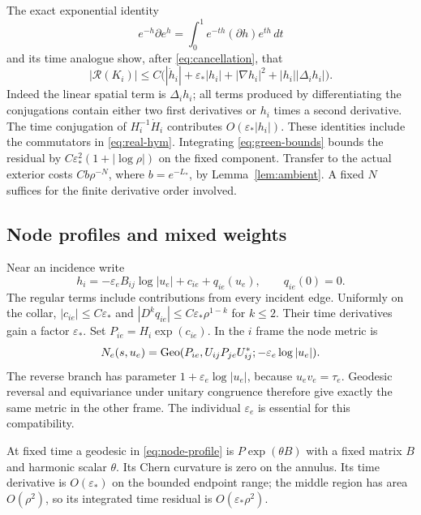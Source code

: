 The exact exponential identity
\[
 e^{-h}\partial e^h
 =\int_0^1e^{-th}(\partial h)e^{th}\,dt
\]
and its time analogue show, after
\eqref{eq:cancellation}, that
\[
 |\mathcal R(K_i)|
 \le C\big(
 |\dot h_i|+\varepsilon_*|h_i|
 +|\nabla h_i|^2+|h_i||\Delta_i h_i|\big).
\]
Indeed the linear spatial term is $\Delta_i h_i$;
all terms produced by differentiating the conjugations
contain either two first derivatives or $h_i$ times
a second derivative. The time conjugation of
$H_i^{-1}\dot H_i$ contributes
$O(\varepsilon_*|h_i|)$. These identities include
the commutators in \eqref{eq:real-hym}. Integrating
\eqref{eq:green-bounds} bounds the residual by
$C\varepsilon_*^2(1+|\log\rho|)$ on the fixed
component. Transfer to the actual exterior costs
$Cb\rho^{-N}$, where $b=e^{-L_*}$, by
Lemma~\ref{lem:ambient}. A fixed $N$ suffices for
the finite derivative order involved.

\subsection{Node profiles and mixed weights}
Near an incidence write
\[
 h_i=-\varepsilon_eB_{ij}\log|u_e|+c_{ie}+q_{ie}(u_e),
 \qquad q_{ie}(0)=0.
\]
The regular terms include contributions from every
incident edge. Uniformly on the collar,
$|c_{ie}|\le C\varepsilon_*$ and
$|D^kq_{ie}|\le C\varepsilon_*\rho^{1-k}$
for $k\le2$. Their time derivatives gain
a factor $\varepsilon_*$.
Set $P_{ie}=H_i\exp(c_{ie})$. In the $i$ frame
the node metric is
\begin{equation}\label{eq:node-profile}
 N_e(s,u_e)=
 \operatorname{Geo}(P_{ie},U_{ij}P_{je}U_{ij}^*;
                  -\varepsilon_e\log|u_e|).
\end{equation}
The reverse branch has parameter
$1+\varepsilon_e\log|u_e|$, because $u_ev_e=\tau_e$.
Geodesic reversal and equivariance under unitary
congruence therefore give exactly the same metric
in the other frame. The individual $\varepsilon_e$
is essential for this compatibility.

At fixed time a geodesic in
\eqref{eq:node-profile} is $P\exp(\theta B)$
with a fixed matrix $B$ and harmonic scalar
$\theta$. Its Chern curvature is zero on the
annulus. Its time derivative is $O(\varepsilon_*)$
on the bounded endpoint range; the middle region
has area $O(\rho^2)$, so its integrated time
residual is $O(\varepsilon_*\rho^2)$.

